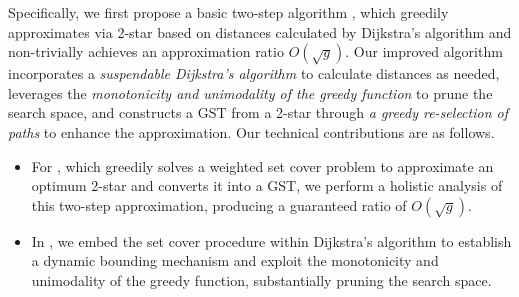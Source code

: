 Specifically, we first propose a basic two-step algorithm \BasicPTS, which greedily approximates via 2-star based on distances calculated by Dijkstra's algorithm and non-trivially achieves an approximation ratio $O(\sqrt g)$.
Our improved algorithm \ImprovPTS incorporates a \emph{suspendable Dijkstra's algorithm} to calculate distances as needed, leverages the \emph{monotonicity and unimodality of the greedy function} to prune the search space, and constructs a GST from a 2-star through \emph{a greedy re-selection of paths} to enhance the approximation.
Our technical contributions are as follows.
\begin{itemize}
  \item For \BasicPTS, which greedily solves a weighted set cover problem to approximate an optimum 2-star and converts it into a GST, we perform a holistic analysis of this two-step approximation, producing a guaranteed ratio of $O(\sqrt g)$.
  \item In \ImprovPTS, we embed the set cover procedure within Dijkstra's algorithm to establish a dynamic bounding mechanism and exploit the monotonicity and unimodality of the greedy function, substantially pruning the search space.
\end{itemize}


